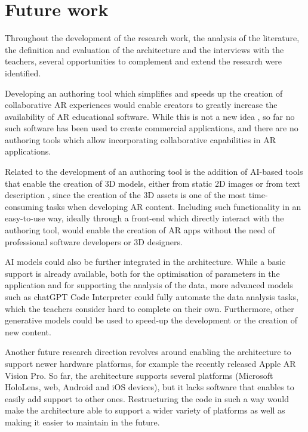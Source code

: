 \section{Future work}
Throughout the development of the research work, the analysis of the literature, the definition and evaluation of the architecture and the interviews with the teachers, several opportunities to complement and extend the research were identified.

Developing an authoring tool which simplifies and speeds up the creation of collaborative AR experiences would enable creators to greatly increase the availability of AR educational software. While this is not a new idea \citep{rajaram2022paper, thanyadit2022easy}, so far no such software has been used to create commercial applications, and there are no authoring tools which allow incorporating collaborative capabilities in AR applications.

Related to the development of an authoring tool is the addition of AI-based tools that enable the creation of 3D models, either from static 2D images \citep{mildenhall2021nerf} or from text description \citep{poole2022dreamfusion, deitke2023objaversexl}, since the creation of the 3D assets is one of the most time-consuming tasks when developing AR content. Including such functionality in an easy-to-use way, ideally through a front-end which directly interact with the authoring tool, would enable the creation of AR apps without the need of professional software developers or 3D designers.

AI models could also be further integrated in the architecture. While a basic support is already available, both for the optimisation of parameters in the application and for supporting the analysis of the data, more advanced models such as chatGPT Code Interpreter \citep{openai2023gpt4} could fully automate the data analysis tasks, which the teachers consider hard to complete on their own. Furthermore, other generative models could be used to speed-up the development or the creation of new content.

Another future research direction revolves around enabling the \arch{} architecture to support newer hardware platforms, for example the recently released Apple AR Vision Pro. So far, the architecture supports several platforms (Microsoft HoloLens, web, Android and iOS devices), but it lacks software that enables to easily add support to other ones. Restructuring the code in such a way would make the architecture able to support a wider variety of platforms as well as making it easier to maintain in the future. 

